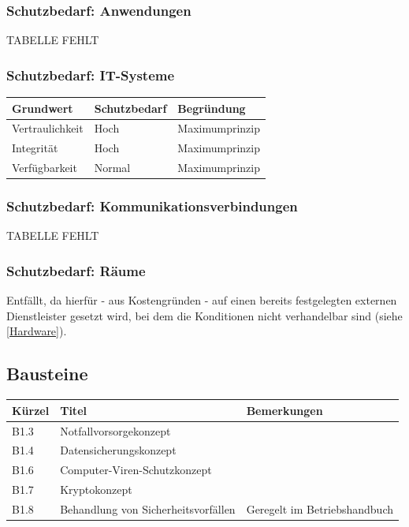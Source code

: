 \subsubsection{Schutzbedarf: Anwendungen}
TABELLE FEHLT
 
\subsubsection{Schutzbedarf: IT-Systeme}
\begin{minipage}{\textwidth}
\begin{center}
\begin{tabular}{lll}
\toprule
Grundwert & Schutzbedarf & Begründung \\
\midrule
Vertraulichkeit & Hoch & Maximumprinzip \\
Integrität & Hoch & Maximumprinzip \\
Verfügbarkeit & Normal & Maximumprinzip \\
\bottomrule
\end{tabular}
\end{center}
\end{minipage}

\subsubsection{Schutzbedarf: Kommunikationsverbindungen}
TABELLE FEHLT

\subsubsection{Schutzbedarf: Räume}
Entfällt, da hierfür - aus Kostengründen - auf einen bereits festgelegten externen Dienstleister gesetzt wird, bei dem die Konditionen nicht verhandelbar sind (siehe \ref{Hardware}).

\subsection{Bausteine}
\begin{minipage}{\textwidth}
\begin{center}
\begin{tabular}{p{1cm}p{5cm}p{9cm}}
\toprule
Kürzel 	& Titel & Bemerkungen \\
\midrule
B1.3 	& Notfallvorsorgekonzept & \\
B1.4 	& Datensicherungskonzept & \\
B1.6 	& Computer-Viren-Schutzkonzept & \\
B1.7 	& Kryptokonzept	& \\
B1.8 	& Behandlung von \newline Sicherheitsvorfällen & Geregelt im Betriebshandbuch \\
\bottomrule
\end{tabular}
\end{center}
\end{minipage}
\bigskip

